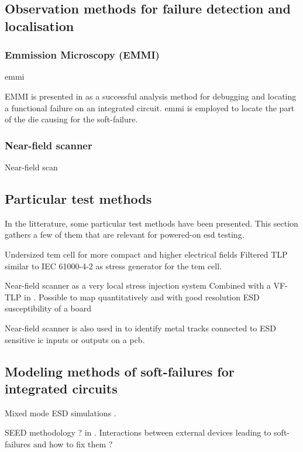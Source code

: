 \subsection{Observation methods for failure detection and localisation}

\subsubsection{Emmission Microscopy (EMMI)}
\gls{emmi}

%
EMMI is presented in \cite{softfailEMMI} as a successful analysis method for debugging and locating a functional failure on an integrated circuit.
\gls{emmi} is employed to locate the part of the die causing for the soft-failure.

\subsubsection{Near-field scanner}
Near-field scan


\subsection{Particular test methods}

In the litterature, some particular test methods have been presented.
This section gathers a few of them that are relevant for powered-on \gls{esd} testing.

%
Undersized \gls{tem} cell for more compact and higher electrical fields \cite{SDRAMCase}
Filtered TLP similar to IEC 61000-4-2 \cite{iec61000-4-2} as stress generator for the \gls{tem} cell.

%
Near-field scanner as a very local stress injection system
Combined with a VF-TLP in \cite{NearFieldInjectionFabrice}.
Possible to map quantitatively and with good resolution ESD susceptibility of a board

%
Near-field scanner is also used in \cite{NearFieldInjectionBis} to identify metal tracks connected to ESD sensitive \gls{ic} inputs or outputs on a \gls{pcb}.


\subsection{Modeling methods of soft-failures for integrated circuits}

%
Mixed mode ESD simulations \cite{mixedModeESDSims}.

%
SEED methodology ? in \cite{usb2ESDProtection}.
Interactions between external devices leading to soft-failures and how to fix them ?


